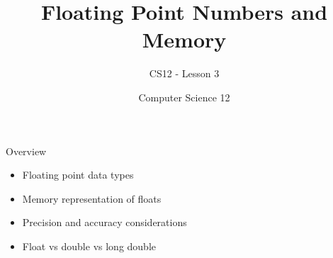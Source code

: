 \documentclass[10pt]{beamer}
\title{Floating Point Numbers and Memory}
\subtitle{CS12 - Lesson 3}
\author{Computer Science 12}
\date{}
\begin{document}
\begin{frame}
    \titlepage
\end{frame}

\begin{frame}{Overview}
    \begin{itemize}
        \item Floating point data types
        \item Memory representation of floats
        \item Precision and accuracy considerations
        \item Float vs double vs long double
    \end{itemize}
\end{frame}

\end{document}
